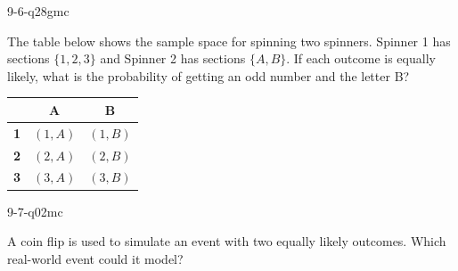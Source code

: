 \begin{practiceQuestion}{9-6-q28}{gmc}
\begin{questionText}
The table below shows the sample space for spinning two spinners. Spinner 1 has sections $\{1, 2, 3\}$ and Spinner 2 has sections $\{A, B\}$. If each outcome is equally likely, what is the probability of getting an odd number and the letter B?

\begin{center}
\begin{tabular}{|c|c|c|}
\hline
 & \textbf{A} & \textbf{B} \\
\hline
\textbf{1} & $(1,A)$ & \cellcolor{funGreen!20}$(1,B)$ \\
\hline
\textbf{2} & $(2,A)$ & $(2,B)$ \\
\hline
\textbf{3} & $(3,A)$ & \cellcolor{funGreen!20}$(3,B)$ \\
\hline
\end{tabular}
\end{center}
\end{questionText}
\end{practiceQuestion}

\begin{practiceQuestion}{9-7-q02}{mc}
\begin{questionText}
A coin flip is used to simulate an event with two equally likely outcomes. Which real-world event could it model?
\end{questionText}
\end{practiceQuestion}
